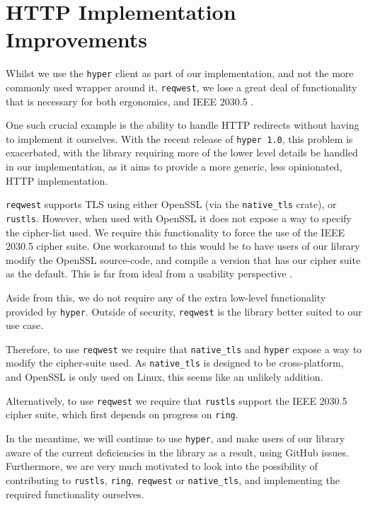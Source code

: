 \section{HTTP Implementation Improvements}
Whilst we use the \texttt{hyper} client as part of our implementation, and not the more commonly used wrapper around it, \texttt{reqwest}, we lose a great deal of functionality that is necessary for both ergonomics, and IEEE 2030.5 \cite{reqwest}. 

One such crucial example is the ability to handle HTTP redirects without having to implement it ourselves.
With the recent release of \texttt{hyper 1.0}, this problem is exacerbated, with the library requiring more of the lower level details be handled in our implementation, as it aims to provide a more generic, less opinionated, HTTP implementation.   

\texttt{reqwest} supports TLS using either OpenSSL (via the \texttt{native\_tls} crate), or \texttt{rustls}. However, when used with OpenSSL it does not expose a way to specify the cipher-list used. We require this functionality to force the use of the IEEE 2030.5 cipher suite. One workaround to this would be to have users of our library modify the OpenSSL source-code, and compile a version that has our cipher suite as the default. This is far from ideal from a usability perspective \cite{reqwestopenssl}.

Aside from this, we do not require any of the extra low-level functionality provided by \texttt{hyper}. Outside of security, \texttt{reqwest} is the library better suited to our use case.

Therefore, to use \texttt{reqwest} we require that \texttt{native\_tls} and \texttt{hyper} expose a way to modify the cipher-suite used. As \texttt{native\_tls} is designed to be cross-platform, and OpenSSL is only used on Linux, this seems like an unlikely addition.

Alternatively, to use \texttt{reqwest} we require that \texttt{rustls} support the IEEE 2030.5 cipher suite, which first depends on progress on \texttt{ring}.

In the meantime, we will continue to use \texttt{hyper}, and make users of our library aware of the current deficiencies in the library as a result, using GitHub issues.
Furthermore, we are very much motivated to look into the possibility of contributing to \texttt{rustls}, \texttt{ring}, \texttt{reqwest} or \texttt{native\_tls}, and implementing the required functionality ourselves.


